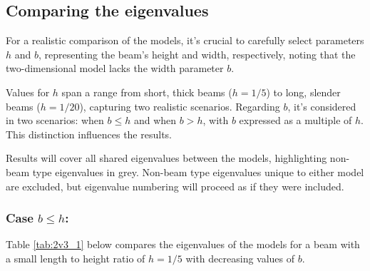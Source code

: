 \subsection*{Comparing the eigenvalues}
For a realistic comparison of the models, it's crucial to carefully select parameters $h$ and $b$, representing the beam's height and width, respectively, noting that the two-dimensional model lacks the width parameter $b$.

Values for $h$ span a range from short, thick beams ($h = 1/5$) to long, slender beams ($h = 1/20$), capturing two realistic scenarios. Regarding $b$, it's considered in two scenarios: when $b \leq h$ and when $b > h$, with $b$ expressed as a multiple of $h$. This distinction influences the results.

Results will cover all shared eigenvalues between the models, highlighting non-beam type eigenvalues in grey. Non-beam type eigenvalues unique to either model are excluded, but eigenvalue numbering will proceed as if they were included.

\subsubsection*{Case $b \leq h$:}
Table \ref{tab:2v3_1} below compares the eigenvalues of the models for a beam with a small length to height ratio of $h=1/5$ with decreasing values of $b$. 

